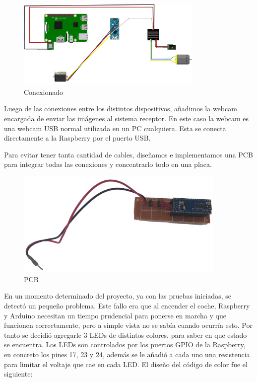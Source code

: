 \documentclass{pclass}
\begin{document}
\begin{itemize}
\begin{figure}[H]
	\centering
	\includegraphics[angle=90,width=0.8\textwidth]{img/conexionado}
	\caption{Conexionado}
	\label{fig:conexionado}
\end{figure}

Luego de las conexiones entre los distintos dispositivos, añadimos la webcam encargada de enviar las imágenes al sistema receptor. En este caso la webcam es una webcam USB normal utilizada en un PC cualquiera. Esta se conecta directamente a la Raspberry por el puerto USB. 

Para evitar tener tanta cantidad de cables, diseñamos e implementamos una PCB para integrar todas las conexiones y concentrarlo todo en una placa.

\begin{figure}[H]
	\centering
	\includegraphics[width=0.9\textwidth]{img/pcb}
	\caption{PCB}
	\label{fig:pcb}
\end{figure}

En un momento determinado del proyecto, ya con las pruebas iniciadas, se detectó un pequeño problema. Este fallo era que al encender el coche, Raspberry y Arduino necesitan un tiempo prudencial para ponerse en marcha y que funcionen correctamente, pero a simple vista no se sabía cuando ocurría esto. Por tanto se decidió agregarle 3 LEDs de distintos colores, para saber en que estado se encuentra. Los LEDs son controlados por los puertos GPIO de la Raspberry, en concreto los pines 17, 23 y 24, además se le añadió a cada uno una resistencia para limitar el voltaje que cae en cada LED. El diseño del código de color fue el siguiente:


\end{itemize}
\end{document}
